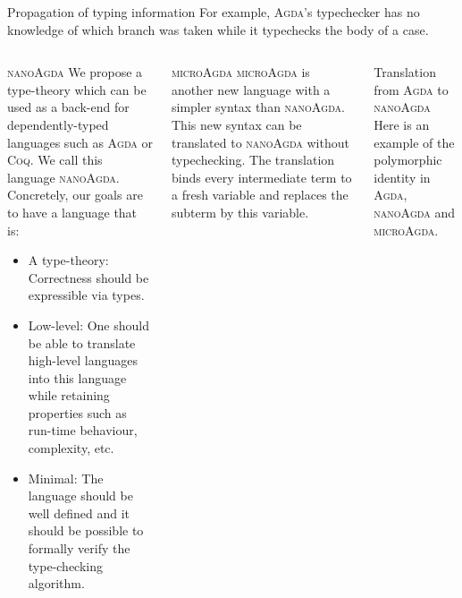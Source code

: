 \documentclass[final, xcolor=svgnames]{beamer}
\newcommand{\coq}{\textsc{Coq}\xspace}
\newcommand{\agda}{\textsc{Agda}\xspace}
\newcommand{\ma}{\textsc{microAgda}\xspace}
\newcommand{\na}{\textsc{nanoAgda}\xspace}
\begin{document}
\begin{frame}[shrink]
\begin{columns}[t]
\begin{block}{Propagation of typing information}
      For example, \agda's typechecker has no knowledge of which branch was taken while it typechecks the body of a case.
      \begin{center}
        \begin{minipage}{0.85\textwidth}
          
        \end{minipage}
     \end{center}
   \end{block}
 \end{columns}
 \vspace{6cm}
 \begin{columns}[t]
   \begin{block}{\na}
     We propose a type-theory which can be used as a back-end for dependently-typed languages such as \agda or \coq. We call this language \na. Concretely, our goals are to have a language that is:
     \begin{itemize}
     \item A type-theory: Correctness should be expressible via types.
     \item Low-level: One should be able to translate high-level languages into this language while retaining properties such as run-time behaviour, complexity, etc.
     \item Minimal: The language should be well defined and it should be possible to formally verify the type-checking algorithm.
     \end{itemize}
   \end{block}
   \begin{block}{\ma}
     \ma is another new language with a simpler syntax than \na. This new syntax can be translated to \na without typechecking. The translation binds every intermediate term to a fresh variable and replaces the subterm by this variable.
     \vspace{25pt}
   \end{block}
   \begin{block}{Translation from \agda to \na}
     Here is an example of the polymorphic identity in \agda, \na and \ma.
     \begin{figure}
\end{figure}
\end{block}
\end{columns}
\end{frame}
\end{document}
